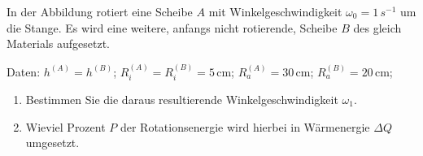 \begin{ExerciseBlock}
In der Abbildung rotiert eine Scheibe $A$ mit Winkelgeschwindigkeit $\omega_0 = 1 \,s^{-1}$ um die Stange. Es wird eine weitere, anfangs nicht rotierende, Scheibe $B$ des gleich Materials aufgesetzt.

Daten: $h^{(A)} = h^{(B)}$; $R_i^{(A)} = R_i^{(B)} = 5\,$cm; $R_a^{(A)} = 30\,$cm; $R_a^{(B)} = 20\,$cm;

\begin{enumerate}
	\item Bestimmen Sie die daraus resultierende Winkelgeschwindigkeit $\omega_1$.
	\item Wieviel Prozent $P$ der Rotationsenergie wird hierbei in  Wärmenergie $\Delta Q$ umgesetzt.

\end{enumerate}

\begin{center}
\end{center}
\end{ExerciseBlock}
